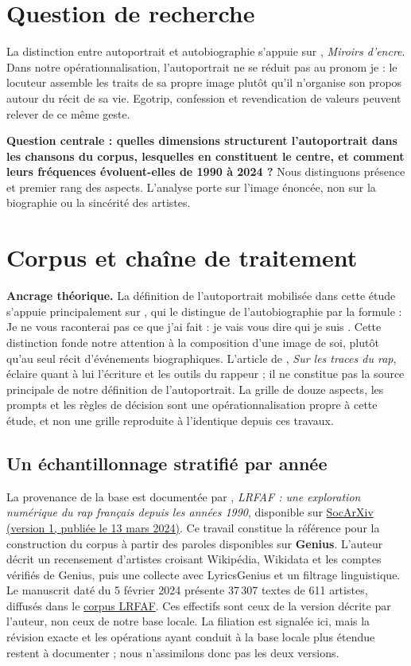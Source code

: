 \documentclass[a4paper,11pt]{article}
\begin{document}
\section{Question de recherche}
La distinction entre autoportrait et autobiographie s'appuie sur
\citet{beaujour1980}, \emph{Miroirs d'encre}. Dans notre opérationnalisation,
l'autoportrait ne se réduit pas au pronom \og je \fg{} : le locuteur assemble
les traits de sa propre image plutôt qu'il n'organise son propos autour
du récit de sa vie. Egotrip, confession et revendication de valeurs peuvent
relever de ce même geste.

\textbf{Question centrale : quelles dimensions structurent l'autoportrait
dans les chansons du corpus, lesquelles en constituent le centre, et comment
leurs fréquences évoluent-elles de 1990 à 2024 ?} Nous distinguons présence
et premier rang des aspects. L'analyse porte sur l'image énoncée, non sur
la biographie ou la sincérité des artistes.

\section{Corpus et chaîne de traitement}
\textbf{Ancrage théorique.}
La définition de l'autoportrait mobilisée dans cette étude s'appuie
principalement sur \citet{beaujour1980}, qui le distingue de l'autobiographie
par la formule : \og Je ne vous raconterai pas ce que j'ai fait : je vais
vous dire qui je suis \fg{}.
Cette distinction fonde notre attention à la composition d'une image de soi,
plutôt qu'au seul récit d'événements biographiques. L'article de
\citet{bethune2011}, \emph{Sur les traces du rap}, éclaire quant à lui
l'écriture et les outils du rappeur ; il ne constitue pas la source
principale de notre définition de l'autoportrait. La grille de douze aspects,
les prompts et les règles de décision sont une opérationnalisation propre
à cette étude, et non une grille reproduite à l'identique depuis ces travaux.

\subsection{Un échantillonnage stratifié par année}
La provenance de la base est documentée par \citet{decourson2024},
\emph{LRFAF : une exploration numérique du rap français depuis les années
1990}, disponible sur \href{https://osf.io/d96tr_v1}{SocArXiv (version 1,
publiée le 13 mars 2024)}. Ce travail constitue la référence pour la construction du corpus
à partir des paroles disponibles sur \textbf{Genius}. L'auteur décrit un
recensement d'artistes croisant Wikipédia, Wikidata et les comptes vérifiés
de Genius, puis une collecte avec LyricsGenius et un filtrage linguistique.
Le manuscrit daté du 5 février 2024 présente 37\,307 textes de 611 artistes,
diffusés dans le \href{https://huggingface.co/datasets/regicid/LRFAF}{corpus LRFAF}.
Ces effectifs sont ceux de la version décrite par l'auteur, non ceux de
notre base locale. La filiation est signalée ici, mais la révision exacte
et les opérations ayant conduit à la base locale plus étendue restent à
documenter ; nous n'assimilons donc pas les deux versions.
\end{document}
